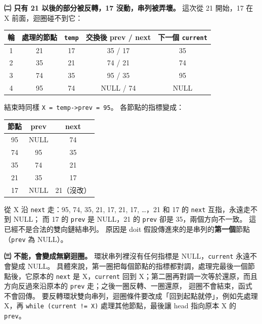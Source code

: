 \begin{pastsoln}
\textbf{㈡ 只有 21 以後的部分被反轉，17 沒動，串列被弄壞。} 這次從 21 開始，17 在 X 前面，迴圈碰不到它：
\begin{center}
\begin{tabular}{ccccc}
\toprule
輪 & 處理的節點 & \texttt{temp} & 交換後 prev / next & 下一個 \texttt{current} \\
\midrule
1 & 21 & 17 & 35 / 17 & 35 \\
2 & 35 & 21 & 74 / 21 & 74 \\
3 & 74 & 35 & 95 / 35 & 95 \\
4 & 95 & 74 & NULL / 74 & NULL \\
\bottomrule
\end{tabular}
\end{center}
結束時同樣 \texttt{X = temp->prev = 95}。 各節點的指標變成：
\begin{center}
\begin{tabular}{ccc}
\toprule
節點 & prev & next \\
\midrule
95 & NULL & 74 \\
74 & 95 & 35 \\
35 & 74 & 21 \\
21 & 35 & 17 \\
17 & NULL & 21（沒改） \\
\bottomrule
\end{tabular}
\end{center}
\begin{center}
\end{center}
從 X 沿 \texttt{next} 走：95, 74, 35, 21, 17, 21, 17, \dots，21 和 17 的 \texttt{next} 互指，永遠走不到 NULL；
而 17 的 \texttt{prev} 是 NULL，21 的 \texttt{prev} 卻是 35，兩個方向不一致。 這已經不是合法的雙向鏈結串列。
原因是 doit 假設傳進來的是串列的\textbf{第一個}節點（\texttt{prev} 為 NULL）。

\textbf{㈢ 不能，會變成無窮迴圈。} 環狀串列裡沒有任何指標是 NULL，\texttt{current} 永遠不會變成 NULL。
具體來說，第一圈把每個節點的指標都對調，處理完最後一個節點後，它原本的 \texttt{next} 是 X，\texttt{current}
回到 X；第二圈再對調一次等於還原，而且方向反過來沿原本的 \texttt{prev} 走；之後一圈反轉、一圈還原，
迴圈不會結束，函式不會回傳。 要反轉環狀雙向串列，迴圈條件要改成「回到起點就停」，例如先處理 X，再
\texttt{while (current != X)} 處理其他節點，最後讓 head 指向原本 X 的 \texttt{prev}。
\end{pastsoln}
